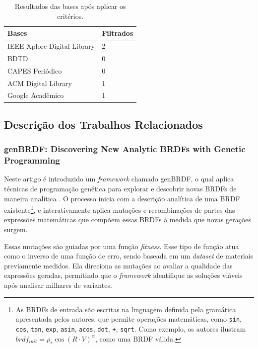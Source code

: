 \begin{table}[H]
\ABNTEXfontereduzida
  \caption{\small Resultados das bases após aplicar os critérios.}
\label{tab-result}
\begin{tabular}{p{6.6cm}|p{6.6cm}}
   \textbf{Bases}  & \textbf{Filtrados}\\
   \hline
    IEEE Xplore Digital Library
   & 2
    \\ \hline
    BDTD
    & 0
    \\ \hline
    CAPES Periódico
    & 0
    \\ \hline


  ACM Digital Library
  & 1
    \\ \hline
 Google Acadêmico
  & 1
\end{tabular}
\end{table}





\subsection{Descrição dos Trabalhos Relacionados}


\subsubsection{genBRDF: Discovering New Analytic BRDFs with Genetic Programming}


Neste artigo é introduzido um \textit{framework} chamado genBRDF, o qual aplica técnicas de programação genética para explorar e descobrir novas BRDFs de maneira analítica \cite{genbrdf}. O processo inicia com a descrição analítica de uma BRDF existente\footnote{As BRDFs de entrada são escritas na linguagem definida pela gramática apresentada pelos autores, que permite operações matemáticas, como \verb"sin", \verb"cos", \verb"tan", \verb"exp", \verb"asin", \verb"acos", \verb"dot", \verb"+", \verb"sqrt". Como exemplo, os autores ilustram ${brdf}_{init} = \rho_s \cos(R \cdot V)^\alpha$, como uma BRDF válida.}, e interativamente aplica mutações e recombinações de partes das expressões matemáticas que compõem essas BRDFs à medida que novas gerações surgem.

Essas mutações são guiadas por uma função \textit{fitness}.
Esse tipo de função atua como o inverso de uma função de erro, sendo baseada em um \textit{dataset} de materiais previamente medidos. Ela direciona as mutações ao avaliar a qualidade das expressões geradas, permitindo que o \textit{framework} identifique as soluções viáveis após analisar milhares de variantes.

